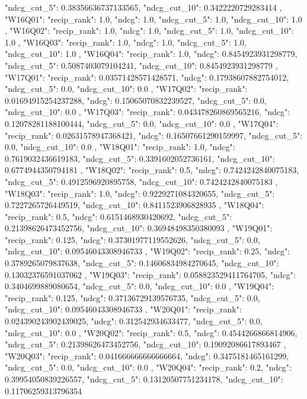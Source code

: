 {{  "ndcg_cut_5": 0.38356636737133565,
  "ndcg_cut_10": 0.3422220729283414
 },
 "W16Q01": {
  "recip_rank": 1.0,
  "ndcg": 1.0,
  "ndcg_cut_5": 1.0,
  "ndcg_cut_10": 1.0
 },
 "W16Q02": {
  "recip_rank": 1.0,
  "ndcg": 1.0,
  "ndcg_cut_5": 1.0,
  "ndcg_cut_10": 1.0
 },
 "W16Q03": {
  "recip_rank": 1.0,
  "ndcg": 1.0,
  "ndcg_cut_5": 1.0,
  "ndcg_cut_10": 1.0
 },
 "W16Q04": {
  "recip_rank": 1.0,
  "ndcg": 0.8454923931298779,
  "ndcg_cut_5": 0.5087403079104241,
  "ndcg_cut_10": 0.8454923931298779
 },
 "W17Q01": {
  "recip_rank": 0.03571428571428571,
  "ndcg": 0.17938607882754012,
  "ndcg_cut_5": 0.0,
  "ndcg_cut_10": 0.0
 },
 "W17Q02": {
  "recip_rank": 0.01694915254237288,
  "ndcg": 0.15065070832239527,
  "ndcg_cut_5": 0.0,
  "ndcg_cut_10": 0.0
 },
 "W17Q03": {
  "recip_rank": 0.043478260869565216,
  "ndcg": 0.12078281188100444,
  "ndcg_cut_5": 0.0,
  "ndcg_cut_10": 0.0
 },
 "W17Q04": {
  "recip_rank": 0.02631578947368421,
  "ndcg": 0.16507661290159997,
  "ndcg_cut_5": 0.0,
  "ndcg_cut_10": 0.0
 },
 "W18Q01": {
  "recip_rank": 1.0,
  "ndcg": 0.7619032436619183,
  "ndcg_cut_5": 0.3391602052736161,
  "ndcg_cut_10": 0.6774944350794181
 },
 "W18Q02": {
  "recip_rank": 0.5,
  "ndcg": 0.7424242840075183,
  "ndcg_cut_5": 0.4912596920895758,
  "ndcg_cut_10": 0.7424242840075183
 },
 "W18Q03": {
  "recip_rank": 1.0,
  "ndcg": 0.9229271084320655,
  "ndcg_cut_5": 0.7227265726449519,
  "ndcg_cut_10": 0.8411523906828935
 },
 "W18Q04": {
  "recip_rank": 0.5,
  "ndcg": 0.6151468930420692,
  "ndcg_cut_5": 0.21398626473452756,
  "ndcg_cut_10": 0.36948498350380093
 },
 "W19Q01": {
  "recip_rank": 0.125,
  "ndcg": 0.37301977119552626,
  "ndcg_cut_5": 0.0,
  "ndcg_cut_10": 0.09546043308946733
 },
 "W19Q02": {
  "recip_rank": 0.25,
  "ndcg": 0.3789265079837638,
  "ndcg_cut_5": 0.14606834984270645,
  "ndcg_cut_10": 0.13032376591037062
 },
 "W19Q03": {
  "recip_rank": 0.058823529411764705,
  "ndcg": 0.3404699889080654,
  "ndcg_cut_5": 0.0,
  "ndcg_cut_10": 0.0
 },
 "W19Q04": {
  "recip_rank": 0.125,
  "ndcg": 0.37136729139576735,
  "ndcg_cut_5": 0.0,
  "ndcg_cut_10": 0.09546043308946733
 },
 "W20Q01": {
  "recip_rank": 0.024390243902439025,
  "ndcg": 0.312542934633477,
  "ndcg_cut_5": 0.0,
  "ndcg_cut_10": 0.0
 },
 "W20Q02": {
  "recip_rank": 0.5,
  "ndcg": 0.4544266866814906,
  "ndcg_cut_5": 0.21398626473452756,
  "ndcg_cut_10": 0.19092086617893467
 },
 "W20Q03": {
  "recip_rank": 0.041666666666666664,
  "ndcg": 0.3475181465161299,
  "ndcg_cut_5": 0.0,
  "ndcg_cut_10": 0.0
 },
 "W20Q04": {
  "recip_rank": 0.2,
  "ndcg": 0.39954050839226557,
  "ndcg_cut_5": 0.13120507751234178,
  "ndcg_cut_10": 0.11706259313796354
}}
